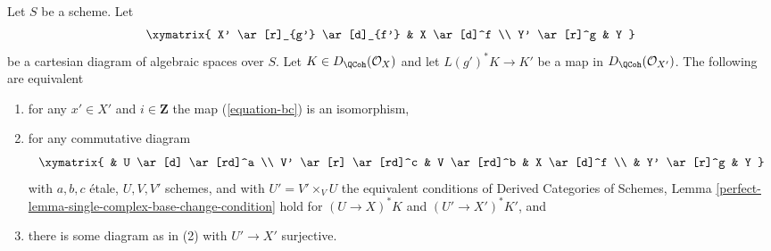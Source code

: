 \begin{lemma}
\label{lemma-single-complex-base-change-condition}
Let $S$ be a scheme. Let
$$
\xymatrix{
X' \ar[r]_{g'} \ar[d]_{f'} &
X \ar[d]^f \\
Y' \ar[r]^g &
Y
}
$$
be a cartesian diagram of algebraic spaces over $S$.
Let $K \in D_\QCoh(\mathcal{O}_X)$ and let $L(g')^*K \to K'$
be a map in $D_\QCoh(\mathcal{O}_{X'})$. The following are equivalent
\begin{enumerate}
\item for any $x' \in X'$ and $i \in \mathbf{Z}$ the map (\ref{equation-bc})
is an isomorphism,
\item for any commutative diagram
$$
\xymatrix{
& U \ar[d] \ar[rd]^a \\
V' \ar[r] \ar[rd]^c & V \ar[rd]^b & X \ar[d]^f \\
& Y' \ar[r]^g & Y
}
$$
with $a, b, c$ \'etale, $U, V, V'$ schemes, and with $U' = V' \times_V U$
the equivalent conditions of
Derived Categories of Schemes, Lemma
\ref{perfect-lemma-single-complex-base-change-condition}
hold for $(U \to X)^*K$ and $(U' \to X')^*K'$, and
\item there is some diagram as in (2) with $U' \to X'$ surjective.
\end{enumerate}
\end{lemma}


